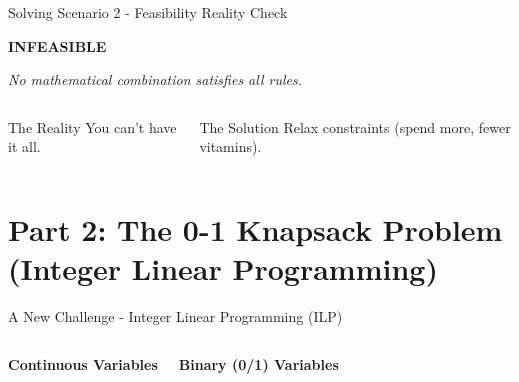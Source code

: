 \documentclass{beamer}
\begin{document}
\begin{frame}{Solving Scenario 2 - Feasibility Reality Check}
  \begin{center}
    \textbf{\Large INFEASIBLE}
    
    \vspace{0.5cm}
    \textit{No mathematical combination satisfies all rules.}
    
    \vspace{1cm}
    \begin{columns}
      \begin{block}{The Reality}
        You can't have it all.
      \end{block}
      
      \begin{block}{The Solution}
        Relax constraints (spend more, fewer vitamins).
      \end{block}
    \end{columns}
  \end{center}
\end{frame}

\section{Part 2: The 0-1 Knapsack Problem (Integer Linear Programming)}

\begin{frame}{A New Challenge - Integer Linear Programming (ILP)}
  \begin{columns}
    \centering
    \textbf{Continuous Variables}
    
    \vspace{0.5cm}
    
    \centering
    \textbf{Binary (0/1) Variables}
    
    \vspace{0.5cm}
  \end{columns}
\end{frame}
\end{document}
